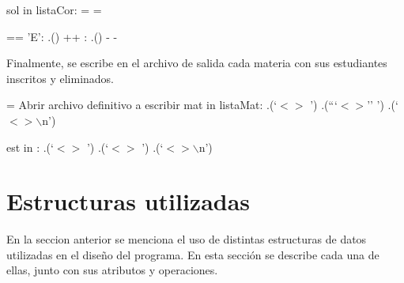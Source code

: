 \documentclass[11pt]{article}
\begin{document}
   \begin{codebox}
      \li \For sol in listaCor:
      \Do
         \li {} = 
         \li {} = 

         \li \If {} == 'E':
         \Do 
            \li {}.()
            \li {}++
         \li \Else:
            \li {}.()
            \li {}- -
         \End

         

         \label{li:Procesar-Solicitudes-Correccion-final}
         \End
      \End
   \end{codebox}

   Finalmente, se escribe en el archivo de salida cada materia con sus 
   estudiantes inscritos y eliminados.

   \begin{codebox}
      \li {} = Abrir archivo definitivo a escribir
      \li \For mat in listaMat:
      \Do
         \li {}.(`$<$$>$ ')
         \li {}.(```$<$$>$'' ')
         \li {}.(`$<$$>\backslash$n')
         
         \li \For est in :
         \Do
            \li {}.(`$<$$>$ ')
            \li {}.(`$<$$>$ ') 
            \li {}.(`$<$$>\backslash$n') 
            
            \label{li:Generar-Archivo-Tentativo-final}
            \End
         \End
         \End
      \End
   \end{codebox}

   \section{Estructuras utilizadas}

   En la seccion anterior se menciona el uso de distintas estructuras de datos
   utilizadas en el diseño del programa. En esta sección se describe cada una
   de ellas, junto con sus atributos y operaciones.
\end{document}

